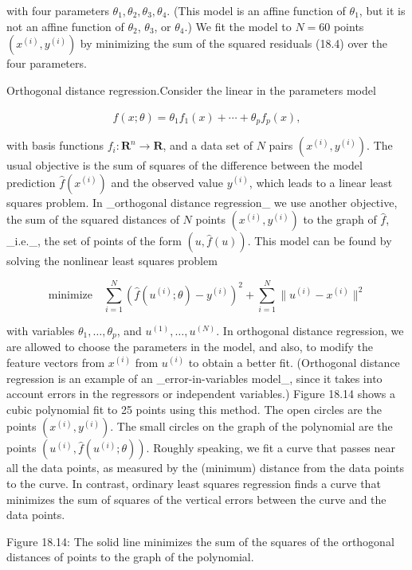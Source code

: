 with four parameters \(\theta_{1},\theta_{2},\theta_{3},\theta_{4}\). (This model is an affine function of \(\theta_{1}\), but it is not an affine function of \(\theta_{2}\), \(\theta_{3}\), or \(\theta_{4}\).) We fit the model to \(N=60\) points \((x^{(i)},y^{(i)})\) by minimizing the sum of the squared residuals (18.4) over the four parameters.

Orthogonal distance regression.Consider the linear in the parameters model

\[\hat{f}(x;\theta)=\theta_{1}f_{1}(x)+\cdots+\theta_{p}f_{p}(x),\]

with basis functions \(f_{i}:\mathbf{R}^{n}\to\mathbf{R}\), and a data set of \(N\) pairs \((x^{(i)},y^{(i)})\). The usual objective is the sum of squares of the difference between the model prediction \(\hat{f}(x^{(i)})\) and the observed value \(y^{(i)}\), which leads to a linear least squares problem. In _orthogonal distance regression_ we use another objective, the sum of the squared distances of \(N\) points \((x^{(i)},y^{(i)})\) to the graph of \(\hat{f}\), _i.e._, the set of points of the form \((u,\hat{f}(u))\). This model can be found by solving the nonlinear least squares problem

\[\text{minimize}\quad\sum_{i=1}^{N}(\hat{f}(u^{(i)};\theta)-y^{(i)})^{2}+\sum_ {i=1}^{N}\|u^{(i)}-x^{(i)}\|^{2}\]

with variables \(\theta_{1},\ldots,\theta_{p}\), and \(u^{(1)},\ldots,u^{(N)}\). In orthogonal distance regression, we are allowed to choose the parameters in the model, and also, to modify the feature vectors from \(x^{(i)}\) from \(u^{(i)}\) to obtain a better fit. (Orthogonal distance regression is an example of an _error-in-variables model_, since it takes into account errors in the regressors or independent variables.) Figure 18.14 shows a cubic polynomial fit to 25 points using this method. The open circles are the points \((x^{(i)},y^{(i)})\). The small circles on the graph of the polynomial are the points \((u^{(i)},\hat{f}(u^{(i)};\theta))\). Roughly speaking, we fit a curve that passes near all the data points, as measured by the (minimum) distance from the data points to the curve. In contrast, ordinary least squares regression finds a curve that minimizes the sum of squares of the vertical errors between the curve and the data points.

Figure 18.14: The solid line minimizes the sum of the squares of the orthogonal distances of points to the graph of the polynomial.

 